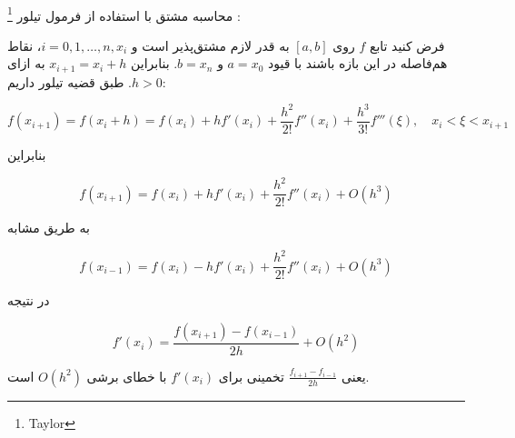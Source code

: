 \\
محاسبه مشتق با استفاده از فرمول تیلور
\footnote{Taylor}
:

فرض کنید تابع \( f \) روی \([a, b]\) به قدر لازم مشتق‌پذیر است و \( i = 0, 1, \ldots, n , x_i \)،  نقاط هم‌فاصله در این بازه باشند با قیود \( a = x_0 \) و \( b = x_n \). بنابراین \( x_{i+1} = x_i + h \) به ازای \( h>0 \). طبق قضیه تیلور داریم:

\[ f(x_{i + 1}) = f(x_i + h) = f(x_i) + hf'(x_i) + \frac{h^2}{2!}f''(x_i) + \frac{h^3}{3!}f'''(\xi) , \quad x_i < \xi < x_{i+1} \]

بنابراین

\[ f(x_{i + 1}) = f(x_i) + hf'(x_i) + \frac{h^2}{2!}f''(x_i) + O(h^3) \]

به طریق مشابه

\[ f(x_{i-1}) = f(x_i) - hf'(x_i) + \frac{h^2}{2!}f''(x_i) + O(h^3) \]

در نتیجه

\[ f'(x_i) = \frac{f(x_{i+1}) - f(x_{i-1})}{2h} + O(h^2) \]

یعنی \( \frac{f_{i+1} - f_{i-1}}{2h} \) تخمینی برای \( f'(x_i) \) با خطای برشی \( O(h^2) \) است.